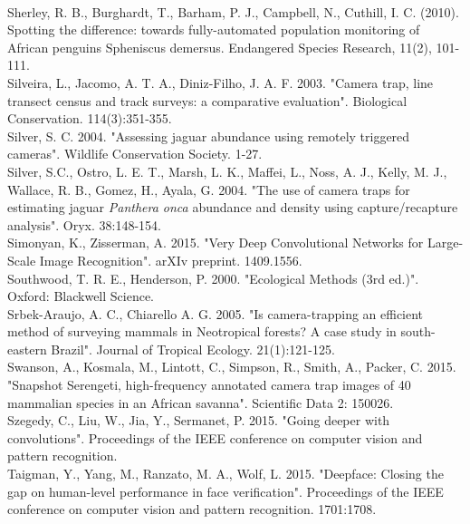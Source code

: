 \documentclass[11pt]{article}
\begin{document}
\newline
\\
Sherley, R. B., Burghardt, T., Barham, P. J., Campbell, N., Cuthill, I. C. (2010). Spotting the difference: towards fully-automated population monitoring of African penguins Spheniscus demersus. Endangered Species Research, 11(2), 101-111.
\newline
\\
Silveira, L., Jacomo, A. T. A., Diniz-Filho, J. A. F. 2003. "Camera trap, line transect census and track surveys: a comparative evaluation". Biological Conservation. 114(3):351-355.
\newline
\\
Silver, S. C. 2004. "Assessing jaguar abundance using remotely triggered cameras". Wildlife Conservation Society. 1-27.
\newline
\\
Silver, S.C., Ostro, L. E. T., Marsh, L. K., Maffei, L., Noss, A. J., Kelly, M. J., Wallace, R. B., Gomez, H., Ayala, G. 2004. "The use of camera traps for estimating jaguar \textit{Panthera onca} abundance and density using capture/recapture analysis". Oryx. 38:148-154.
\newline
\\
Simonyan, K., Zisserman, A. 2015. "Very Deep Convolutional Networks for Large-Scale Image Recognition". arXIv preprint. 1409.1556.
\newline
\\
Southwood, T. R. E., Henderson, P. 2000. "Ecological Methods (3rd ed.)". Oxford: Blackwell Science.
\newline
\\
Srbek-Araujo, A. C., Chiarello A. G. 2005. "Is camera-trapping an efficient method of surveying mammals in Neotropical forests? A case study in south-eastern Brazil". Journal of Tropical Ecology. 21(1):121-125.
\newline
\\
Swanson, A., Kosmala, M., Lintott, C., Simpson, R., Smith, A., Packer, C. 2015. "Snapshot Serengeti, high-frequency annotated camera trap images of 40 mammalian species in an African savanna". Scientific Data 2: 150026.
\newline
\\
Szegedy, C., Liu, W., Jia, Y., Sermanet, P. 2015. "Going deeper with convolutions". Proceedings of the IEEE conference on computer vision and pattern recognition.
\newline
\\
Taigman, Y., Yang, M., Ranzato, M. A., Wolf, L. 2015. "Deepface: Closing the gap on human-level performance in face verification". Proceedings of the IEEE conference on computer vision and pattern recognition. 1701:1708.
\end{document}
